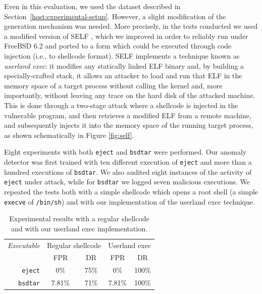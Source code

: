 Even in this evaluation, we used the dataset described in
Section~\ref{host:experimental-setup}. However, a slight modification
of the generation mechanism was needed. More precisely, in the tests
conducted we used a modified version of SELF \citep{SELF-TOOL}, which
we improved in order to reliably run under \textsf{FreeBSD} 6.2 and
ported to a form which could be executed through code injection (i.e.,
to shellcode format). SELF implements a technique known as
\emph{userland exec}: it modifies any statically linked
\ac{ELF} binary and, by building a specially-crafted stack,
it allows an attacker to load and run that \ac{ELF} in the
memory space of a target process without calling the kernel and, more
importantly, without leaving any trace on the hard disk of the
attacked machine. This is done through a two-stage attack where a
shellcode is injected in the vulnerable program, and then retrieves a
modified \ac{ELF} from a remote machine, and subsequently
injects it into the memory space of the running target process, as
shown schematically in Figure \ref{fig:self}.

Eight experiments with both \texttt{eject} and \texttt{bsdtar} were performed. Our anomaly detector was first trained with ten different execution of \texttt{eject} and more than a hundred executions of \texttt{bsdtar}. We also audited eight instances of the activity of \texttt{eject} under attack, while for \texttt{bsdtar} we logged seven malicious executions. We repeated the tests both with a simple shellcode which opens a root shell (a simple \texttt{execve} of \texttt{/bin/sh}) and with our implementation of the userland exec technique.

\begin{table}[t]
  \centering
  \begin{tabular}{rcccc}
    \toprule
    \emph{Executable} & \multicolumn{2}{c}{Regular shellcode} & \multicolumn{2}{c}{Userland exec}\\
    \cmidrule{2-5}
    & FPR     & DR     & FPR     & DR\\
    \midrule
    \texttt{eject}  & 0\%     & 75\% & 0\% & 100\%\\
    \texttt{bsdtar} & 7.81\%  & 71\% & 7.81\% & 100\%\\
    \bottomrule
  \end{tabular}
  \caption{Experimental results with a regular shellcode and with our userland exec implementation.}
  \label{tab:results}
\end{table}

